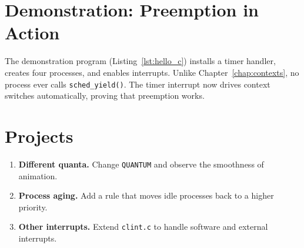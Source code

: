 \section{Demonstration: Preemption in Action}

The demonstration program (Listing~\ref{lst:hello_c}) installs a timer handler,
creates four processes, and enables interrupts. Unlike Chapter~\ref{chap:contexts},
no process ever calls \texttt{sched\_yield()}. The timer interrupt now drives
context switches automatically, proving that preemption works.

\begin{figure}[H]
\centering

\end{figure}

\section*{Projects}

\begin{enumerate}
  \item \textbf{Different quanta.} Change \texttt{QUANTUM} and observe the
        smoothness of animation.
  \item \textbf{Process aging.} Add a rule that moves idle processes back to a
        higher priority.
  \item \textbf{Other interrupts.} Extend \texttt{clint.c} to handle software
        and external interrupts.
\end{enumerate}
